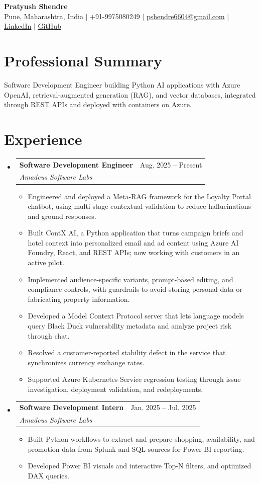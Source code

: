 \documentclass[a4paper,11pt]{article}
\makeatletter
\newcommand{\entry}[4]{\item\begin{tabularx}{\textwidth}{@{}Xr@{}}\textbf{#1}& #2\\\textit{\small #3}&\textit{\small #4}\end{tabularx}\vspace{-5pt}}
\newcommand{\bulletpoint}[1]{\item\small{#1}}
\makeatother
\begin{document}
\begin{center}
  {\Large\bfseries Pratyush Shendre}\\[2pt]
  \small Pune, Maharashtra, India $|$ +91-9975080249 $|$
  \href{mailto:pshendre6604@gmail.com}{pshendre6604@gmail.com} $|$
  \href{https://www.linkedin.com/in/pratyush-shendre-2256a7223/}{\underline{LinkedIn}} $|$
  \href{https://github.com/PratyushS04}{\underline{GitHub}}
\end{center}

\section{Professional Summary}
\small Software Development Engineer building Python AI applications with Azure OpenAI, retrieval-augmented generation (RAG), and vector databases, integrated through REST APIs and deployed with containers on Azure.

\section{Experience}
\begin{itemize}[leftmargin=0in,label={}]
  \entry{Software Development Engineer}{Aug. 2025 -- Present}{Amadeus Software Labs}{}
  \begin{itemize}
    \bulletpoint{Engineered and deployed a Meta-RAG framework for the Loyalty Portal chatbot, using multi-stage contextual validation to reduce hallucinations and ground responses.}
    \bulletpoint{Built ContX AI, a Python application that turns campaign briefs and hotel context into personalized email and ad content using Azure AI Foundry, React, and REST APIs; now working with customers in an active pilot.}
    \bulletpoint{Implemented audience-specif{}ic variants, prompt-based editing, and compliance controls, with guardrails to avoid storing personal data or fabricating property information.}
    \bulletpoint{Developed a Model Context Protocol server that lets language models query Black Duck vulnerability metadata and analyze project risk through chat.}
    \bulletpoint{Resolved a customer-reported stability defect in the service that synchronizes currency exchange rates.}
    \bulletpoint{Supported Azure Kubernetes Service regression testing through issue investigation, deployment validation, and redeployments.}
  \end{itemize}
  \entry{Software Development Intern}{Jan. 2025 -- Jul. 2025}{Amadeus Software Labs}{}
  \begin{itemize}
    \bulletpoint{Built Python workf{}lows to extract and prepare shopping, availability, and promotion data from Splunk and SQL sources for Power BI reporting.}
    \bulletpoint{Developed Power BI visuals and interactive Top-N f{}ilters, and optimized DAX queries.}
  \end{itemize}
\end{itemize}
\end{document}
